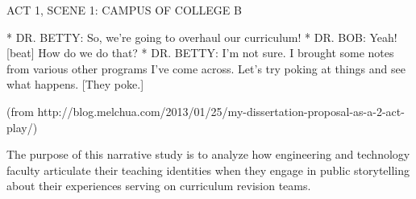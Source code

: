 ACT 1, SCENE 1: CAMPUS OF COLLEGE B

* DR. BETTY: So, we’re going to overhaul our curriculum!
* DR. BOB: Yeah! [beat] How do we do that?
* DR. BETTY: I’m not sure. I brought some notes from various other programs I’ve come across. Let’s try poking at things and see what happens. [They poke.]

(from http://blog.melchua.com/2013/01/25/my-dissertation-proposal-as-a-2-act-play/)

The purpose of this narrative study is to analyze how engineering and technology faculty articulate their teaching identities when they engage in public storytelling about their experiences serving on curriculum revision teams.

